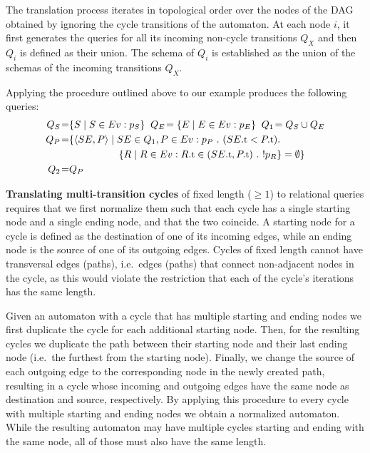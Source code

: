 The translation process iterates in topological order over the nodes of the DAG
obtained by ignoring the cycle transitions of the automaton.
At each node $i$, it first generates the queries for all its incoming
non-cycle transitions $Q_X$ and then $Q_i$ is defined as their union. 
The schema of $Q_i$ is established as the union of the schemas of the incoming 
transitions $Q_X$.

Applying the procedure outlined above to our example produces the following 
queries:
\begin{align*}
Q_S\!=& \{ S \mid S \in \Ev : p_S \}
\;\;
Q_E\!= \{ E \mid E \in \Ev : p_E \}
\;\;
Q_1\!= Q_S \cup Q_E
\\
Q_P\!=& \{ \tuple{SE,P} \mid SE \in Q_1, P \in \Ev:
p_P\ .\ (\facc{SE}{t} < \facc{P}{t}) . 
\\
& 
\qqquad\quad
\{ R \mid R \in \Ev : \facc{R}{t} \in (\facc{SE}{t}, \facc{P}{t})\ .\ 
						! p_R \} = \emptyset
 \}
\\
Q_2\!=& Q_P
\end{align*}

{\bf Translating multi-transition cycles} of fixed length 
($\geq 1$) to relational queries
requires that we first normalize them such that each cycle
has a single starting node and a single ending node, and that the two coincide.
A starting node for a cycle is defined as the destination of one of its 
incoming edges, while an ending node is the source of one of its outgoing edges.
Cycles of fixed length cannot have transversal edges (paths), 
i.e.\ edges (paths) that connect non-adjacent nodes in the cycle, as this would 
violate the restriction that each of the cycle's iterations has the same length.


Given an automaton with a cycle that has multiple starting and ending nodes 
we first duplicate the cycle for each additional starting node. 
Then, for the resulting cycles we duplicate the path between their starting 
node and their last ending node (i.e.\ the furthest from the starting node).  
Finally, we change the source of each outgoing edge to the corresponding 
node in the newly created path, resulting in a cycle whose incoming and 
outgoing edges have the same node as destination and source, respectively.
By applying this procedure to every cycle with multiple starting and ending 
nodes we obtain a normalized automaton.  
While the resulting automaton may have multiple cycles starting 
and ending with the same node, all of those must also have the same length.


